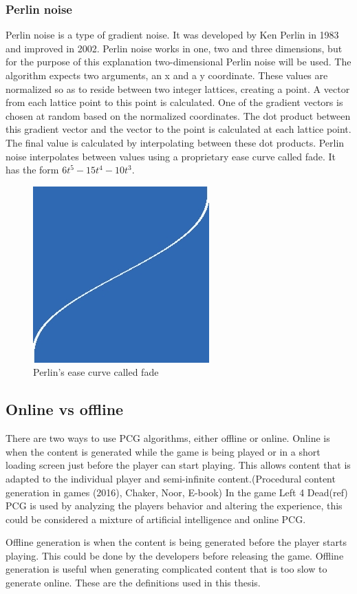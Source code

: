 		\subsubsection{Perlin noise}
		Perlin noise is a type of gradient noise. It was developed by Ken Perlin in 1983 and improved in 2002\cite{PerlinNoise}. Perlin noise works in one, two and three dimensions, but for the purpose of this explanation two-dimensional Perlin noise will be used. The algorithm expects two arguments, an x and a y coordinate. These values are normalized so as to reside between two integer lattices, creating a point. A vector from each lattice point to this point is calculated. One of the gradient vectors is chosen at random based on the normalized coordinates. The dot product between this gradient vector and the vector to the point is calculated at each lattice point. The final value is calculated by interpolating between these dot products. Perlin noise interpolates between values using a proprietary ease curve called fade. It has the form \begin{math}6t^5-15t^4-10t^3\end{math}.
		\begin{figure}
			\centering
			\includegraphics[width=0.5\linewidth]{"images/fade"}
			\caption{Perlin's ease curve called fade}
			\label{fig:fade}
		\end{figure}
	
	\subsection{Online vs offline}
	There are two ways to use PCG algorithms, either offline or online. Online is when the content is generated while the game is being played or in a short loading screen just before the player can start playing. This allows content that is adapted to the individual player and semi-infinite content.(Procedural content generation in games (2016), Chaker, Noor, E-book) In the game Left 4 Dead(ref) PCG is used by analyzing the players behavior and altering the experience, this could be considered a mixture of artificial intelligence and online PCG.
	\par Offline generation is when the content is being generated before the player starts playing. This could be done by the developers before releasing the game. Offline generation is useful when generating complicated content that is too slow to generate online.
	These are the definitions used in this thesis.
	
